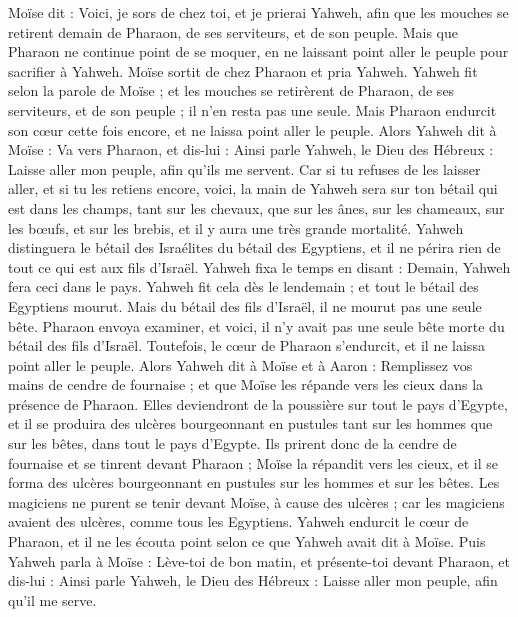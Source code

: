 \begin{multicols}{2}
Moïse dit : Voici, je sors de chez toi, et je prierai Yahweh, afin que les mouches se retirent demain de Pharaon, de ses serviteurs, et de son peuple. Mais que Pharaon ne continue point de se moquer, en ne laissant point aller le peuple pour sacrifier à Yahweh.
Moïse sortit de chez Pharaon et pria Yahweh.
Yahweh fit selon la parole de Moïse ; et les mouches se retirèrent de Pharaon, de ses serviteurs, et de son peuple ; il n’en resta pas une seule.
Mais Pharaon endurcit son cœur cette fois encore, et ne laissa point aller le peuple.
\VerseOne{}Alors Yahweh dit à Moïse : Va vers Pharaon, et dis-lui : Ainsi parle Yahweh, le Dieu des Hébreux : Laisse aller mon peuple, afin qu'ils me servent.
Car si tu refuses de les laisser aller, et si tu les retiens encore,
voici, la main de Yahweh sera sur ton bétail qui est dans les champs, tant sur les chevaux, que sur les ânes, sur les chameaux, sur les bœufs, et sur les brebis, et il y aura une très grande mortalité.
Yahweh distinguera le bétail des Israélites du bétail des Egyptiens, et il ne périra rien de tout ce qui est aux fils d'Israël.
Yahweh fixa le temps en disant : Demain, Yahweh fera ceci dans le pays.
Yahweh fit cela dès le lendemain ; et tout le bétail des Egyptiens mourut. Mais du bétail des fils d'Israël, il ne mourut pas une seule bête.
Pharaon envoya examiner, et voici, il n'y avait pas une seule bête morte du bétail des fils d'Israël. Toutefois, le cœur de Pharaon s'endurcit, et il ne laissa point aller le peuple.
Alors Yahweh dit à Moïse et à Aaron : Remplissez vos mains de cendre de fournaise ; et que Moïse les répande vers les cieux dans la présence de Pharaon.
Elles deviendront de la poussière sur tout le pays d'Egypte, et il se produira des ulcères bourgeonnant en pustules tant sur les hommes que sur les bêtes, dans tout le pays d'Egypte.
Ils prirent donc de la cendre de fournaise et se tinrent devant Pharaon ; Moïse la répandit vers les cieux, et il se forma des ulcères bourgeonnant en pustules sur les hommes et sur les bêtes.
Les magiciens ne purent se tenir devant Moïse, à cause des ulcères ; car les magiciens avaient des ulcères, comme tous les Egyptiens.
Yahweh endurcit le cœur de Pharaon, et il ne les écouta point selon ce que Yahweh avait dit à Moïse.
Puis Yahweh parla à Moïse : Lève-toi de bon matin, et présente-toi devant Pharaon, et dis-lui : Ainsi parle Yahweh, le Dieu des Hébreux : Laisse aller mon peuple, afin qu'il me serve.

\end{multicols}
